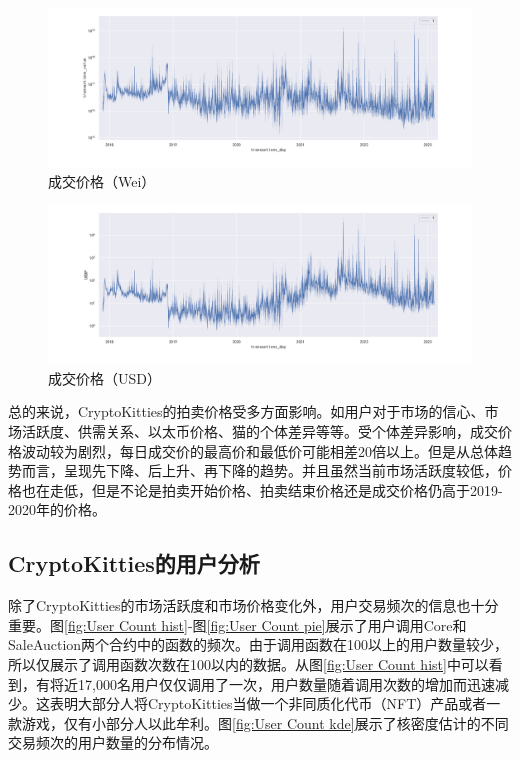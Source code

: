 \documentclass{myreport}
\begin{document}
\begin{figure}[!htbp]
	\centering
	\includegraphics[width=\linewidth]{figure/price transactions_value.pdf}
	\caption{成交价格（Wei）}
	\label{fig:price ETHP}
\end{figure}
\begin{figure}[!htbp]
	\centering
	\includegraphics[width=\linewidth]{figure/price USDP.pdf}
	\caption{成交价格（USD）}
	\label{fig:price USDP}
\end{figure}


总的来说，CryptoKitties的拍卖价格受多方面影响。如用户对于市场的信心、市场活跃度、供需关系、以太币价格、猫的个体差异等等。受个体差异影响，成交价格波动较为剧烈，每日成交价的最高价和最低价可能相差20倍以上。但是从总体趋势而言，呈现先下降、后上升、再下降的趋势。并且虽然当前市场活跃度较低，价格也在走低，但是不论是拍卖开始价格、拍卖结束价格还是成交价格仍高于2019-2020年的价格。


\subsection{CryptoKitties的用户分析}
除了CryptoKitties的市场活跃度和市场价格变化外，用户交易频次的信息也十分重要。图\ref{fig:User Count hist}-图\ref{fig:User Count pie}展示了用户调用Core和SaleAuction两个合约中的函数的频次。由于调用函数在100以上的用户数量较少，所以仅展示了调用函数次数在100以内的数据。从图\ref{fig:User Count hist}中可以看到，有将近17,000名用户仅仅调用了一次，用户数量随着调用次数的增加而迅速减少。这表明大部分人将CryptoKitties当做一个非同质化代币（NFT）产品或者一款游戏，仅有小部分人以此牟利。图\ref{fig:User Count kde}展示了核密度估计的不同交易频次的用户数量的分布情况。
\end{document}

